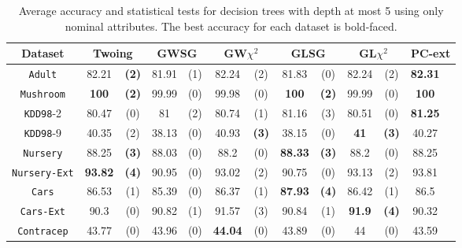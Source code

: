 \begin{table*}[t]
\small
\centering
\caption{Average accuracy and statistical tests  for  decision trees 
with depth at most 5 using only nominal attributes. The best accuracy for each dataset is bold-faced.}
\begin{tabular}{c|cc|cc|cc|cc|cc|cc} 
Dataset & \multicolumn{2}{c|}{Twoing} &  \multicolumn{2}{c|}{GWSG}  
&   \multicolumn{2}{c|}{GW$\chi^2$}                   &\multicolumn{2}{c|}{GLSG}       &\multicolumn{2}{c|}{GL$\chi^2$} & \multicolumn{2}{c}{PC-ext}\\  \hline 
{\tt Adult}         & 82.21    &{\bf(2)}& 81.91    & (1)    & 82.24    & (2)    & 81.83    & (0)    & 82.24    & (2)    &{\bf82.31}&        \\
{\tt Mushroom}      & {\bf 100}&{\bf(2)}& 99.99    & (0)    & 99.98    & (0)    &{\bf  100}&{\bf(2)}& 99.99    & (0)    &{\bf 100} &        \\
{\tt KDD98}-2       & 80.47    & (0)    & 81       & (2)    & 80.74    & (1)    & 81.16    & (3)    & 80.51    & (0)    &{\bf81.25}&        \\
{\tt KDD98}-9       & 40.35    & (2)    & 38.13    & (0)    & 40.93    &{\bf(3)}& 38.15    & (0)    &{\bf 41 } &{\bf(3)}& 40.27    &        \\
{\tt Nursery}       & 88.25    &{\bf(3)}& 88.03    & (0)    & 88.2     & (0)    &{\bf88.33}&{\bf(3)}& 88.2     & (0)    & 88.25    &        \\
{\tt Nursery-Ext}   &{\bf93.82}&{\bf(4)}& 90.95    & (0)    & 93.02    & (2)    & 90.75    & (0)    & 93.13    & (2)    & 93.81    &        \\
{\tt Cars}          & 86.53    & (1)    & 85.39    & (0)    & 86.37    & (1)    &{\bf87.93}&{\bf(4)}& 86.42    & (1)    & 86.5     &        \\
{\tt Cars-Ext}      & 90.3     & (0)    & 90.82    & (1)    & 91.57    & (3)    & 90.84    & (1)    &{\bf 91.9}&{\bf(4)}& 90.32    &        \\
{\tt Contracep}     & 43.77    & (0)    & 43.96    & (0)    &{\bf44.04}& (0)    & 43.89    & (0)    & 44       & (0)    & 43.59    &        \\

\end{tabular}
\end{table*}
